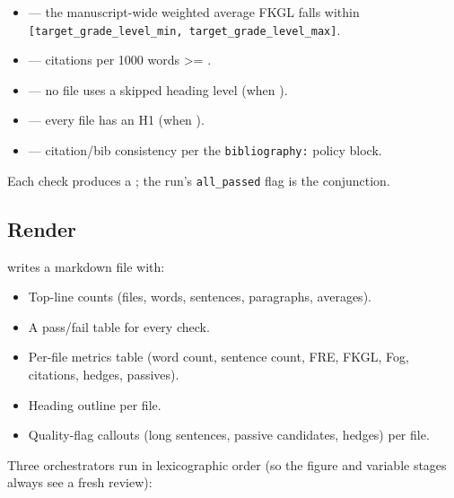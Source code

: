 \documentclass[
]{article}
\providecommand{\tightlist}{%
  \setlength{\itemsep}{0pt}\setlength{\parskip}{0pt}}
\begin{document}
\begin{itemize}
\tightlist
\item
   --- the manuscript-wide weighted
  average FKGL falls within
  \texttt{{[}target\_grade\_level\_min,\ target\_grade\_level\_max{]}}.
\item
   --- citations per 1000 words \texorpdfstring{\textgreater{}=}{>=}
  .
\item
   --- no file uses a skipped
  heading level (when ).
\item
   --- every file has an H1 (when
  ).
\item
   --- citation/bib consistency per the
  \texttt{bibliography:} policy block.
\end{itemize}

Each check produces a ;
the run's \texttt{all\_passed} flag is the conjunction.

\subsection{Render}\label{render}

 writes a markdown file
with:

\begin{itemize}
\tightlist
\item
  Top-line counts (files, words, sentences, paragraphs, averages).
\item
  A pass/fail table for every check.
\item
  Per-file metrics table (word count, sentence count, FRE, FKGL, Fog,
  citations, hedges, passives).
\item
  Heading outline per file.
\item
  Quality-flag callouts (long sentences, passive candidates, hedges) per
  file.
\end{itemize}

Three orchestrators run in lexicographic order (so the figure and
variable stages always see a fresh review):
\end{document}
